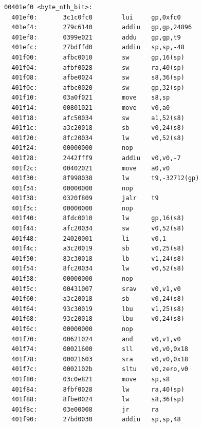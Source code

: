 \documentclass[11pt]{article}
\begin{document}
\begin{verbatim}
00401ef0 <byte_nth_bit>:
  401ef0:       3c1c0fc0        lui     gp,0xfc0
  401ef4:       279c6140        addiu   gp,gp,24896
  401ef8:       0399e021        addu    gp,gp,t9
  401efc:       27bdffd0        addiu   sp,sp,-48
  401f00:       afbc0010        sw      gp,16(sp)
  401f04:       afbf0028        sw      ra,40(sp)
  401f08:       afbe0024        sw      s8,36(sp)
  401f0c:       afbc0020        sw      gp,32(sp)
  401f10:       03a0f021        move    s8,sp
  401f14:       00801021        move    v0,a0
  401f18:       afc50034        sw      a1,52(s8)
  401f1c:       a3c20018        sb      v0,24(s8)
  401f20:       8fc20034        lw      v0,52(s8)
  401f24:       00000000        nop
  401f28:       2442fff9        addiu   v0,v0,-7
  401f2c:       00402021        move    a0,v0
  401f30:       8f998038        lw      t9,-32712(gp)
  401f34:       00000000        nop
  401f38:       0320f809        jalr    t9
  401f3c:       00000000        nop
  401f40:       8fdc0010        lw      gp,16(s8)
  401f44:       afc20034        sw      v0,52(s8)
  401f48:       24020001        li      v0,1
  401f4c:       a3c20019        sb      v0,25(s8)
  401f50:       83c30018        lb      v1,24(s8)
  401f54:       8fc20034        lw      v0,52(s8)
  401f58:       00000000        nop
  401f5c:       00431007        srav    v0,v1,v0
  401f60:       a3c20018        sb      v0,24(s8)
  401f64:       93c30019        lbu     v1,25(s8)
  401f68:       93c20018        lbu     v0,24(s8)
  401f6c:       00000000        nop
  401f70:       00621024        and     v0,v1,v0
  401f74:       00021600        sll     v0,v0,0x18
  401f78:       00021603        sra     v0,v0,0x18
  401f7c:       0002102b        sltu    v0,zero,v0
  401f80:       03c0e821        move    sp,s8
  401f84:       8fbf0028        lw      ra,40(sp)
  401f88:       8fbe0024        lw      s8,36(sp)
  401f8c:       03e00008        jr      ra
  401f90:       27bd0030        addiu   sp,sp,48


\end{verbatim}
\end{document}
